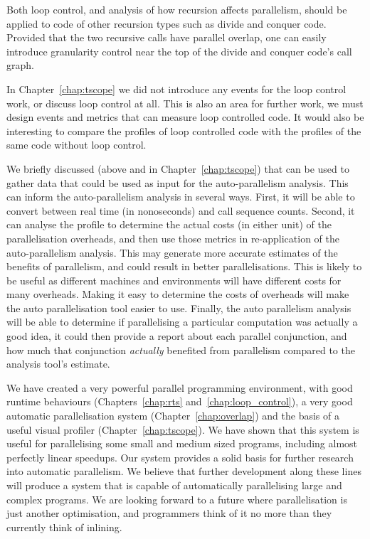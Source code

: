 Both loop control, and analysis of how recursion affects parallelism,
should be applied to code of other recursion types such as divide and
conquer code. 
Provided that the two recursive calls have parallel overlap,
one can easily introduce granularity control near the top of the divide and
conquer code's call graph.


In Chapter~\ref{chap:tscope} we did not introduce any events for the loop
control work, or discuss loop control at all.
This is also an area for further work,
we must design events and metrics that can measure loop controlled code.
It would also be interesting to compare the profiles of loop controlled code
with the profiles of the same code without loop control.

We briefly discussed (above and in Chapter~\ref{chap:tscope}) that
\tscope can be used to gather data that could be used as input for the
auto-parallelism analysis.
This can inform the auto-parallelism analysis in several ways.
First, it will be able to convert between real time (in nonoseconds) and call
sequence counts.
Second, it can analyse the profile to determine the actual costs (in either
unit) of the parallelisation overheads,
and then use those metrics in re-application of the auto-parallelism
analysis.
This may generate more accurate estimates of the benefits of parallelism,
and could result in better parallelisations.
This is likely to be useful as different machines and environments will have
different costs for many overheads.
Making it easy to determine the costs of overheads will make the auto
parallelisation tool easier to use.
Finally, the auto parallelism analysis will be able to determine if
parallelising a particular computation was actually a good idea,
it could then provide a report about each parallel conjunction,
and how much that conjunction \emph{actually} benefited from parallelism
compared to the analysis tool's estimate.

We have created a very powerful parallel programming environment,
with good runtime behaviours (Chapters~\ref{chap:rts}
and~\ref{chap:loop_control}),
a very good automatic parallelisation system (Chapter~\ref{chap:overlap})
and the basis of a useful visual profiler (Chapter~\ref{chap:tscope}).
We have shown that this system is useful for parallelising some small and
medium sized programs, including almost perfectly linear speedups.
Our system provides a solid basis for further research into automatic
parallelism.
We believe that further development along these lines will produce a system
that is capable of automatically parallelising large and complex programs.
We are looking forward to a future where parallelisation is just another
optimisation, and programmers think of it no more than they currently
think of inlining.


